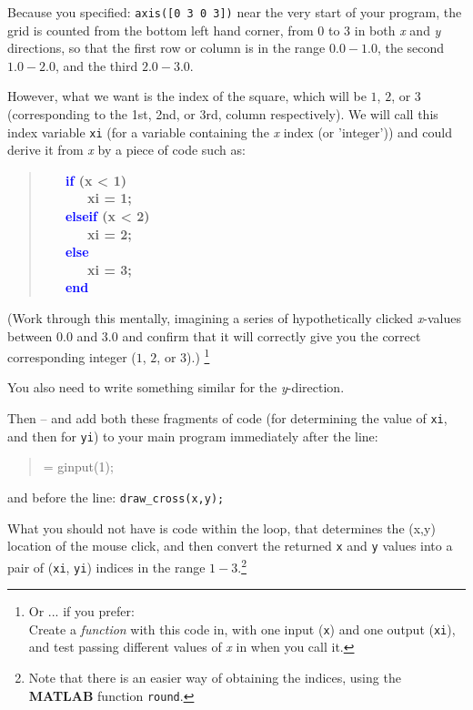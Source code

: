 \documentclass{tufte-book} %
\newenvironment{docspec}{\begin{quotation}\ttfamily\parskip0pt\parindent0pt\ignorespaces}{\end{quotation}}
\newenvironment{docspecbold}{\begin{quotation}\ttfamily\bfseries\parskip0pt\parindent0pt\ignorespaces}{\end{quotation}}
\begin{document}
Because you specified: \texttt{axis([0 3 0 3])} near the very start of your program, the grid is counted from the bottom left hand corner, from 0 to 3 in both \textit{x} and \textit{y}  directions, so that the first row or column is in the range \(0.0-1.0\), the second \(1.0-2.0\), and the third \(2.0-3.0\). 

However, what we want is the index of the square, which will be \(1\), \(2\), or \(3\) (corresponding to the  1st, 2nd, or 3rd, column respectively). We will call this index variable \texttt{xi} (for a variable containing the \textit{x} index (or 'integer')) and could derive it from \textit{x} by a piece of code such as:
\begin{docspecbold}
\ \ \    \textcolor{blue}{if} (x < 1)\\
\ \ \ \ \ \             xi = 1;\\
\ \ \        \textcolor{blue}{elseif} (x < 2)\\
\ \ \ \ \ \             xi = 2;\\       
\ \ \        \textcolor{blue}{else}\\
\ \ \ \ \ \             xi = 3;\\
\ \ \        \textcolor{blue}{end}
\end{docspecbold}
(Work through this mentally, imagining a series of hypothetically clicked \textit{x}-values between \(0.0\) and \(3.0\) and confirm that it will correctly give you the correct corresponding integer (\(1\), \(2\), or \(3\)).) \footnote{Or ... if you prefer:
\\Create a \textit{function} with this code in, with one input (\texttt{x}) and one output (\texttt{xi}), and test passing different values of \textit{x} in when you call it.}

You also need to write something similar for the \textit{y}-direction.

Then --  and add both these fragments of code (for determining the value of \texttt{xi}, and then for \texttt{yi}) to your main program immediately after the line:
\vspace{-1mm}\begin{docspec}
[x,y,button] = ginput(1);
\end{docspec}\vspace{-1mm}
and before the line: \texttt{draw\_cross(x,y);}

What you should not have is code within the loop, that
determines the (x,y) location of the mouse click, and then convert the returned \texttt{x} and \texttt{y} values into a pair of (\texttt{xi}, \texttt{yi}) indices in the range \(1-3\).\footnote{Note that there is an easier way of obtaining the indices, using the \textbf{MATLAB} function \texttt{round}.}
\end{document}
